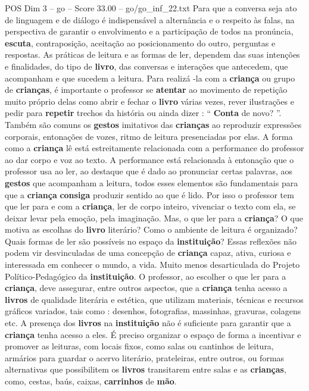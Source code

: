 \begin{textsample}{POS Dim 3 – go – Score 33.00 – go/go\_inf\_22.txt}
Para que a conversa seja ato de linguagem e de diálogo é indispensável a alternância e o respeito às falas, na perspectiva de garantir o envolvimento e a participação de todos na pronúncia, \textbf{escuta}, contraposição, aceitação ao posicionamento do outro, perguntas e respostas.
As práticas de leitura e as formas de ler, dependem das suas intenções e finalidades, do tipo de \textbf{livro}, das conversas e interações que antecedem, que acompanham e que sucedem a leitura.
Para realizá -la com a \textbf{criança} ou grupo de \textbf{crianças}, é importante o professor se \textbf{atentar} ao movimento de repetição muito próprio delas como abrir e fechar o \textbf{livro} várias vezes, rever ilustrações e pedir para \textbf{repetir} trechos da história ou ainda dizer : “ \textbf{Conta} de novo? ”.
Também são comuns os \textbf{gestos} imitativos das \textbf{crianças} ao reproduzir expressões corporais, entonações de vozes, ritmo de leitura presenciadas por elas.
A forma como a \textbf{criança} lê está estreitamente relacionada com a performance do professor ao dar corpo e voz ao texto.
A performance está relacionada à entonação que o professor usa ao ler, ao destaque que é dado ao pronunciar certas palavras, aos \textbf{gestos} que acompanham a leitura, todos esses elementos são fundamentais para que a \textbf{criança} \textbf{consiga} produzir sentido ao que é lido.
Por isso o professor tem que ler para e com a \textbf{criança}, ler de corpo inteiro, vivenciar o texto com ela, se deixar levar pela emoção, pela imaginação.
Mas, o que ler para a \textbf{criança}?
O que motiva as escolhas do \textbf{livro} literário?
Como o ambiente de leitura é organizado?
Quais formas de ler são possíveis no espaço da \textbf{instituição}?
Essas reflexões não podem vir desvinculadas de uma concepção de \textbf{criança} capaz, ativa, curiosa e interessada em conhecer o mundo, a vida.
Muito menos desarticulada do Projeto Político-Pedagógico da \textbf{instituição}.
O professor, ao escolher o que ler para a \textbf{criança}, deve assegurar, entre outros aspectos, que a \textbf{criança} tenha acesso a \textbf{livros} de qualidade literária e estética, que utilizam materiais, técnicas e recursos gráficos variados, tais como : desenhos, fotografias, massinhas, gravuras, colagens etc.
A presença dos \textbf{livros} na \textbf{instituição} não é suficiente para garantir que a \textbf{criança} tenha acesso a eles.
É preciso organizar o espaço de forma a incentivar e promover as leituras, com locais fixos, como salas ou cantinhos de leitura, armários para guardar o acervo literário, prateleiras, entre outros, ou formas alternativas que possibilitem os \textbf{livros} transitarem entre salas e as \textbf{crianças}, como, cestas, baús, caixas, \textbf{carrinhos} de \textbf{mão}.

\end{textsample}
